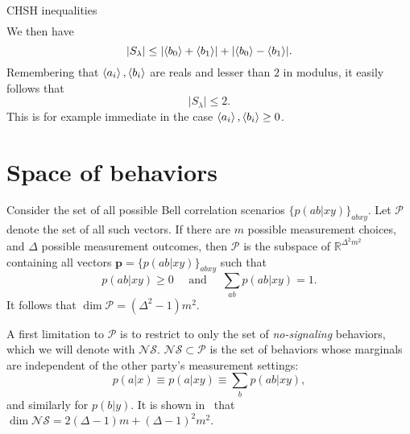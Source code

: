 \documentclass[a4paper]{report}
\newcommand{\RR}{\mathbb{R}}
\begin{document}
\begin{depthbox}[]{CHSH inequalities}
\begin{equation}
\begin{aligned}
    \end{aligned}
    \end{equation}
    We then have
    \begin{equation}
        |S_\lambda| \le \lvert\expval{b_0} + \expval{b_1}\rvert
                      + \lvert\expval{b_0} - \expval{b_1}\rvert.
    \end{equation}
    Remembering that $\expval{a_i},\expval{b_i}$ are reals and lesser than $2$ in modulus, it easily follows that
    \begin{equation}
        \lvert S_\lambda\rvert \le 2.
    \end{equation}
    This is for example immediate in the case $\expval{a_i},\expval{b_i}\ge 0$.
\end{depthbox}

\section{Space of behaviors}
\newcommand{\NS}{\mathcal{N}\mathcal{S}}

Consider the set of all possible Bell correlation scenarios $\{p(ab|xy)\}_{abxy}$.
Let $\mathcal P$ denote the set of all such vectors.
If there are $m$ possible measurement choices, and $\Delta$ possible measurement outcomes, then $\mathcal P$ is the subspace of $\RR^{\Delta^2 m^2}$ containing all vectors $\mathbf p=\{p(ab|xy)\}_{abxy}$ such that
\begin{equation}
    p(ab|xy)\ge0\quad\text{ and }\quad \sum_{ab}p(ab|xy)=1.
\end{equation}
It follows that $\dim\mathcal P=(\Delta^2-1)m^2$.

A first limitation to $\mathcal P$ is to restrict to only the set of \emph{no-signaling} behaviors, which we will denote with $\NS$.
$\NS\subset\mathcal P$ is the set of behaviors whose marginals are independent of the other party's measurement settings:
\begin{equation}
    p(a|x)\equiv p(a|xy)\equiv\sum_b p(ab|xy),
\end{equation}
and similarly for $p(b|y)$.
It is shown in~\autocite{pironio2005lifting} that $\dim\NS=2(\Delta-1)m+(\Delta-1)^2m^2$.
\end{document}
